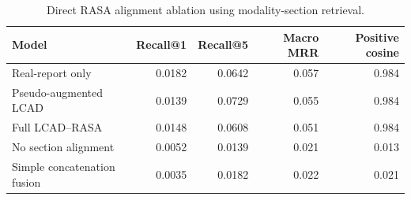 \begin{table}[t]
  \centering
  \caption{Direct RASA alignment ablation using modality-section retrieval.}
  \label{tab:theme1_alignment_ablation}
  \small
  \begin{threeparttable}
  \begin{tabular}{lrrrr}
    \toprule
    \textbf{Model} & \textbf{Recall@1} & \textbf{Recall@5} & \textbf{Macro MRR} & \textbf{Positive cosine} \\
    \midrule
    Real-report only            & 0.0182 & 0.0642 & 0.057 & 0.984 \\
    Pseudo-augmented LCAD       & 0.0139 & 0.0729 & 0.055 & 0.984 \\
    Full LCAD--RASA             & 0.0148 & 0.0608 & 0.051 & 0.984 \\
    \hdashline
    No section alignment        & 0.0052 & 0.0139 & 0.021 & 0.013 \\
    Simple concatenation fusion & 0.0035 & 0.0182 & 0.022 & 0.021 \\
    \bottomrule
  \end{tabular}
  \end{threeparttable}
\end{table}


\begin{table}[t]
  \centering
  \caption{Report-supervision scarcity curve using a lightweight downstream surrogate.}
  \label{tab:scarcity_curve}
  \scriptsize
  \begin{threeparttable}
  \end{threeparttable}
\end{table}


